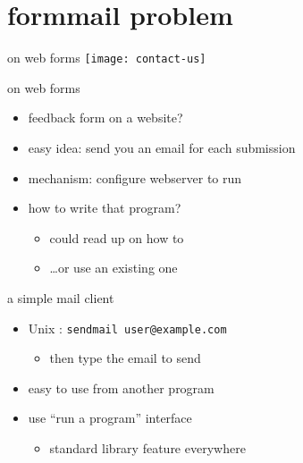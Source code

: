 

\section{formmail problem}

\begin{frame}{on web forms}
    \texttt{[image: contact-us]}
\end{frame}

\begin{frame}{on web forms}
    \begin{itemize}
    \item feedback form on a website?
    \item easy idea: send you an email for each submission
    \item mechanism: configure webserver to run 
    \item how to write that program?
        \begin{itemize}
        \item could read up on how to 
        \item \ldots or use an existing one
        \end{itemize}
    \end{itemize}
\end{frame}

\begin{frame}{a simple mail client}
    \begin{itemize}
        \item Unix : \texttt{sendmail user@example.com}
        \begin{itemize}
        \item then type the email to send
        \end{itemize}
    \item easy to use from another program
    \item use ``run a program'' interface
        \begin{itemize}
        \item standard library feature everywhere
        \end{itemize}
    \end{itemize}
\end{frame}


